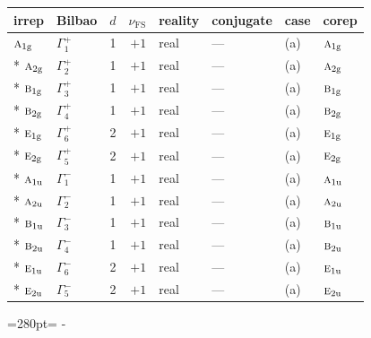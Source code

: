 \documentclass[10pt,a4paper]{article}
\newcommand{\needspace}[1]{\par\penalty-100\begingroup\dimen0=#1\relax\dimen2=\pagegoal
  \advance\dimen2-\pagetotal\ifdim\dimen0>\dimen2\relax\ifdim\dimen2>0pt\vfil\break\fi\fi
  \endgroup}
\numberwithin{equation}{section}
\newcommand{\irr}[1]{\text{\normalfont\scshape #1}}
\newcommand{\ptag}[1]{\mathrm{#1}}
\newcommand{\fsind}{\nu_{\mathrm{FS}}}
\begin{document}
{\small\renewcommand{\arraystretch}{1.25}\setlength{\tabcolsep}{4pt}\begin{longtable}{@{}llrrllll@{}}\toprule
irrep & Bilbao & $d$ & $\fsind$ & reality & conjugate & case & corep\\\midrule\endhead
\bottomrule\endfoot\endlastfoot
$\irr{a}_{1\ptag{g}}$ & $\Gamma_{1}^{+}$ & 1 & $+1$ & real & --- & (a) & $\irr{a}_{1\ptag{g}}$\\*
$\irr{a}_{2\ptag{g}}$ & $\Gamma_{2}^{+}$ & 1 & $+1$ & real & --- & (a) & $\irr{a}_{2\ptag{g}}$\\*
$\irr{b}_{1\ptag{g}}$ & $\Gamma_{3}^{+}$ & 1 & $+1$ & real & --- & (a) & $\irr{b}_{1\ptag{g}}$\\*
$\irr{b}_{2\ptag{g}}$ & $\Gamma_{4}^{+}$ & 1 & $+1$ & real & --- & (a) & $\irr{b}_{2\ptag{g}}$\\*
$\irr{e}_{1\ptag{g}}$ & $\Gamma_{6}^{+}$ & 2 & $+1$ & real & --- & (a) & $\irr{e}_{1\ptag{g}}$\\*
$\irr{e}_{2\ptag{g}}$ & $\Gamma_{5}^{+}$ & 2 & $+1$ & real & --- & (a) & $\irr{e}_{2\ptag{g}}$\\*
$\irr{a}_{1\ptag{u}}$ & $\Gamma_{1}^{-}$ & 1 & $+1$ & real & --- & (a) & $\irr{a}_{1\ptag{u}}$\\*
$\irr{a}_{2\ptag{u}}$ & $\Gamma_{2}^{-}$ & 1 & $+1$ & real & --- & (a) & $\irr{a}_{2\ptag{u}}$\\*
$\irr{b}_{1\ptag{u}}$ & $\Gamma_{3}^{-}$ & 1 & $+1$ & real & --- & (a) & $\irr{b}_{1\ptag{u}}$\\*
$\irr{b}_{2\ptag{u}}$ & $\Gamma_{4}^{-}$ & 1 & $+1$ & real & --- & (a) & $\irr{b}_{2\ptag{u}}$\\*
$\irr{e}_{1\ptag{u}}$ & $\Gamma_{6}^{-}$ & 2 & $+1$ & real & --- & (a) & $\irr{e}_{1\ptag{u}}$\\*
$\irr{e}_{2\ptag{u}}$ & $\Gamma_{5}^{-}$ & 2 & $+1$ & real & --- & (a) & $\irr{e}_{2\ptag{u}}$\\
\bottomrule\end{longtable}}
\needspace{280pt}
\end{document}
